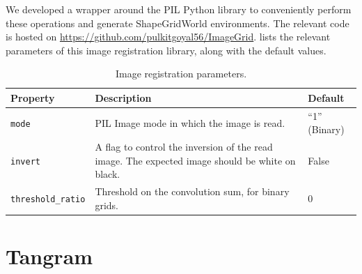 We developed a wrapper around the PIL Python library \citep{pil} to conveniently perform these operations and generate ShapeGridWorld environments.
The relevant code is hosted on \url{https://github.com/pulkitgoyal56/ImageGrid}.
 lists the relevant parameters of this image registration library, along with the default values.
\begin{table}[H]
    \centering
    \caption{Image registration parameters.}
    \begin{tabularx}{\textwidth}{C{3.9cm} L C{2cm}}
        \hline
        Property & Description & Default\\
        \hline
        \texttt{mode} & PIL Image mode in which the image is read. & ``1'' (Binary)\\
        \texttt{invert} & A flag to control the inversion of the read image. The expected image should be white on black. & False \\
        \texttt{threshold\_ratio} & Threshold on the convolution sum, for binary grids. & \(0\)\\
        \hline
    \end{tabularx}
    \label{tab:imagelib-params}
\end{table}

\section{Tangram}
\label{sec:tangram-details}

